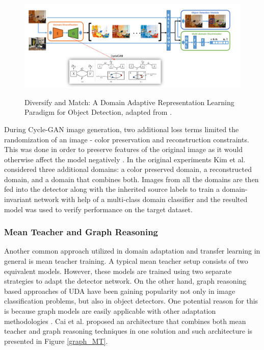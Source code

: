 \begin{figure}[htb]
	\begin{center}
		\includegraphics[width=16cm]{./diversify.png}
	\end{center}
	\caption{Diversify and Match: A Domain Adaptive Representation Learning Paradigm for Object Detection, adapted from \cite{Kim2019}.}
	\begin{center}
		\label{diversify}
	\end{center}
\end{figure}
\FloatBarrier

During Cycle-GAN image generation, two additional loss terms limited the  randomization of an image - color preservation and reconstruction constraints. This was done in order to preserve features of the original image as it would otherwise affect the model negatively \cite{Oza2021}. In the original experiments Kim et al. considered three additional domains: a color preserved domain, a reconstructed domain, and a domain that combines both. Images from all the domains are then fed into the detector along with the inherited source labels   to train a domain-invariant network with help of a multi-class domain classifier and the resulted model was used to verify performance on the target dataset. 

\subsubsection{Mean Teacher and Graph Reasoning}
\label{mean_teacher} 
Another common approach utilized in domain adaptation and transfer learning in general is mean teacher training. A typical mean teacher setup consists of two equivalent models. However, these models are trained using two separate strategies to adapt the detector network. On the other hand, graph reasoning based approaches of UDA have been gaining popularity not only in image classification problems, but also in object detectors. One potential reason for this is because graph models are easily applicable with other adaptation methodologies \cite{Oza2021}. Cai et al. \cite{Cai2019} proposed an architecture that combines both mean teacher and graph reasoning techniques in one solution and such architecture is presented in Figure \ref{graph_MT}. 
 
